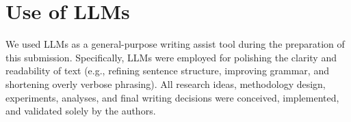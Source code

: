 \section{Use of LLMs}
We used LLMs as a general-purpose writing assist tool during the preparation of this submission. Specifically, LLMs were employed for polishing the clarity and readability of text (e.g., refining sentence structure, improving grammar, and shortening overly verbose phrasing). All research ideas, methodology design, experiments, analyses, and final writing decisions were conceived, implemented, and validated solely by the authors.